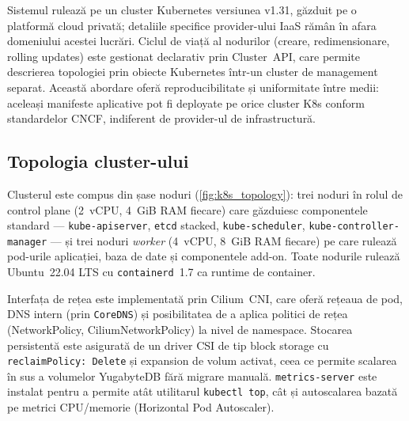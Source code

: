 Sistemul rulează pe un cluster Kubernetes versiunea v1.31, găzduit pe o
platformă cloud privată; detaliile specifice provider-ului IaaS rămân în
afara domeniului acestei lucrări. Ciclul de viață al nodurilor (creare,
redimensionare, rolling updates) este gestionat declarativ prin
Cluster~API, care permite descrierea topologiei prin obiecte Kubernetes
într-un cluster de management separat. Această abordare oferă reproducibilitate
și uniformitate între medii: aceleași manifeste aplicative pot fi deployate
pe orice cluster K8s conform standardelor CNCF, indiferent de provider-ul
de infrastructură.

\subsection{Topologia cluster-ului}
\label{subsec:topologie_k8s}

Clusterul este compus din șase noduri (\cref{fig:k8s_topology}): trei
noduri în rolul de control plane (2~vCPU, 4~GiB RAM fiecare) care
găzduiesc componentele standard --- \texttt{kube-apiserver}, \texttt{etcd}
stacked, \texttt{kube-scheduler}, \texttt{kube-controller-manager} ---
și trei noduri \emph{worker} (4~vCPU, 8~GiB RAM fiecare) pe care rulează
pod-urile aplicației, baza de date și componentele add-on. Toate nodurile
rulează Ubuntu~22.04 LTS cu \texttt{containerd}~1.7 ca runtime de container.

Interfața de rețea este implementată prin Cilium~CNI, care oferă rețeaua
de pod, DNS intern (prin \texttt{CoreDNS}) și posibilitatea de a aplica
politici de rețea (NetworkPolicy, CiliumNetworkPolicy) la nivel de
namespace. Stocarea persistentă este asigurată de un driver CSI de tip
block storage cu \texttt{reclaimPolicy: Delete} și expansion de volum
activat, ceea ce permite scalarea în sus a volumelor YugabyteDB fără
migrare manuală. \texttt{metrics-server} este instalat pentru a permite
atât utilitarul \texttt{kubectl top}, cât și autoscalarea bazată pe
metrici CPU/memorie (Horizontal Pod Autoscaler).

